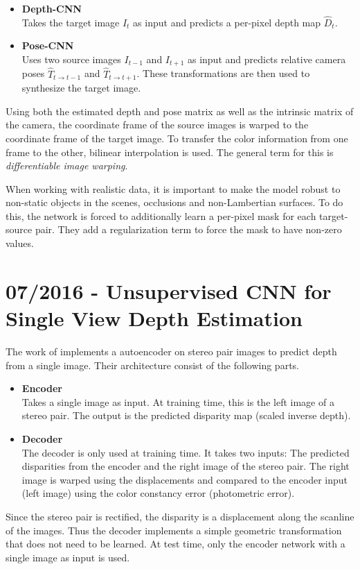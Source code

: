 		\begin{itemize}
			\item \textbf{Depth-CNN}
				\\
				Takes the target image $I_t$ as input and predicts a per-pixel depth map $\hat{D}_t$.
			\item \textbf{Pose-CNN}
				\\
				Uses two source images $I_{t - 1}$ and $I_{t + 1}$ as input and predicts relative camera poses $\hat{T}_{t \rightarrow t - 1}$ and $\hat{T}_{t \rightarrow t + 1}$. 
				These transformations are then used to synthesize the target image.
		\end{itemize}
		Using both the estimated depth and pose matrix as well as the intrinsic matrix of the camera, the coordinate frame of the source images is warped to the coordinate frame of the target image.
		To transfer the color information from one frame to the other, bilinear interpolation is used.
		The general term for this is \emph{differentiable image warping}.
		
		When working with realistic data, it is important to make the model robust to non-static objects in the scenes, occlusions and non-Lambertian surfaces.
		To do this, the network is forced to additionally learn a per-pixel mask for each target-source pair.
		They add a regularization term to force the mask to have non-zero values.
		
		
	\section{07/2016 - Unsupervised CNN for Single View Depth Estimation}
		
		The work of \cite{garg2016} implements a autoencoder on stereo pair images to predict depth from a single image.
		Their architecture consist of the following parts.
		\begin{itemize}
			\item \textbf{Encoder}
				\\
				Takes a single image as input. 
				At training time, this is the left image of a stereo pair.
				The output is the predicted disparity map (scaled inverse depth).
			\item \textbf{Decoder}
				\\
				The decoder is only used at training time.
				It takes two inputs: The predicted disparities from the encoder and the right image of the stereo pair.
				The right image is warped using the displacements and compared to the encoder input (left image) using the color constancy error (photometric error).
		\end{itemize}
		Since the stereo pair is rectified, the disparity is a displacement along the scanline of the images.
		Thus the decoder implements a simple geometric transformation that does not need to be learned.
		At test time, only the encoder network with a single image as input is used.
		
